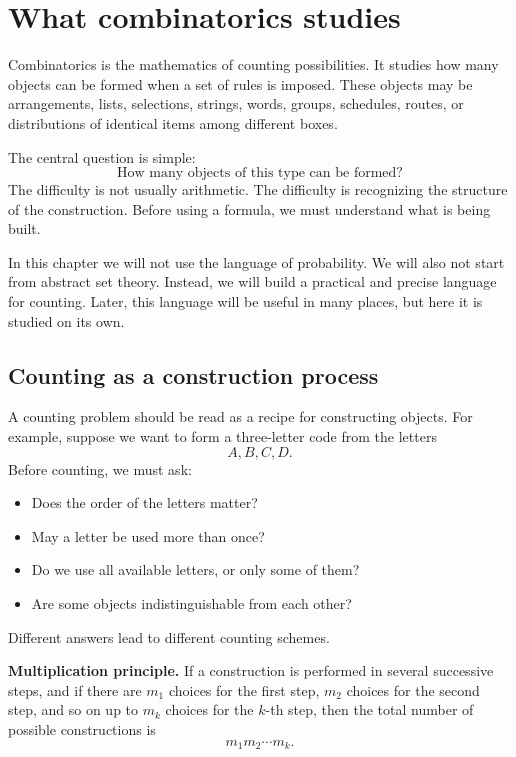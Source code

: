 \section{What combinatorics studies}

Combinatorics is the mathematics of counting possibilities. It studies how many objects can be formed when a set of rules is imposed. These objects may be arrangements, lists, selections, strings, words, groups, schedules, routes, or distributions of identical items among different boxes.

The central question is simple:
\[
\text{How many objects of this type can be formed?}
\]
The difficulty is not usually arithmetic. The difficulty is recognizing the structure of the construction. Before using a formula, we must understand what is being built.

In this chapter we will not use the language of probability. We will also not start from abstract set theory. Instead, we will build a practical and precise language for counting. Later, this language will be useful in many places, but here it is studied on its own.

\subsection*{Counting as a construction process}

A counting problem should be read as a recipe for constructing objects. For example, suppose we want to form a three-letter code from the letters
\[
A,B,C,D.
\]
Before counting, we must ask:
\begin{itemize}
    \item Does the order of the letters matter?
    \item May a letter be used more than once?
    \item Do we use all available letters, or only some of them?
    \item Are some objects indistinguishable from each other?
\end{itemize}
Different answers lead to different counting schemes.

\begin{theorembox}
\textbf{Multiplication principle.} If a construction is performed in several successive steps, and if there are \(m_1\) choices for the first step, \(m_2\) choices for the second step, and so on up to \(m_k\) choices for the \(k\)-th step, then the total number of possible constructions is
\[
m_1m_2\cdots m_k.
\]
\end{theorembox}

